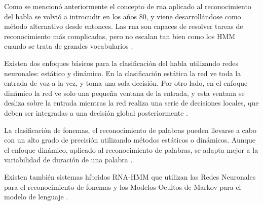 Como se mencion\'o anteriormente el concepto de \gls{rna} aplicado al reconocimiento
del habla se volvi\'o a introcudir en los a\~nos 80, y viene desarroll\'andose como m\'etodo 
alternativo desde entonces. Las \gls{rna} son capaces de resolver tareas de reconocimiento
m\'as complicadas, pero no escalan tan bien como los HMM cuando se trata de grandes 
vocabularios \cite{VimalaReview2012}.

Existen dos enfoques b\'asicos para la clasificaci\'on del habla utilizando redes neuronales: 
est\'atico y din\'amico. En la clasificaci\'on est\'atica la red ve toda la entrada de voz a la vez,
y toma una sola decisi\'on. Por otro lado, en el enfoque din\'amico la red ve solo una peque\~na 
ventana de la entrada, y esta ventana se desliza sobre la entrada mientras la red realiza una 
serie de decisiones locales, que deben ser integradas a una decisi\'on global 
posteriormente \cite{TebelskisSpeech1995}.

La clasificaci\'on de fonemas, el reconocimiento de palabras pueden llevarse a cabo con un alto
grado de precisi\'on utilizando m\'etodos est\'aticos o din\'amicos. Aunque el enfoque din\'amico,
aplicado al reconocimiento de palabras, se adapta mejor a la variabilidad de duraci\'on de una 
palabra \cite{TebelskisSpeech1995}.

Existen tambi\'en sistemas h\'ibridos RNA-HMM que utilizan las Redes Neuronales para el reconocimiento de
fonemas y los Modelos Ocultos de Markov para el modelo de lenguaje \cite{VimalaReview2012}.
